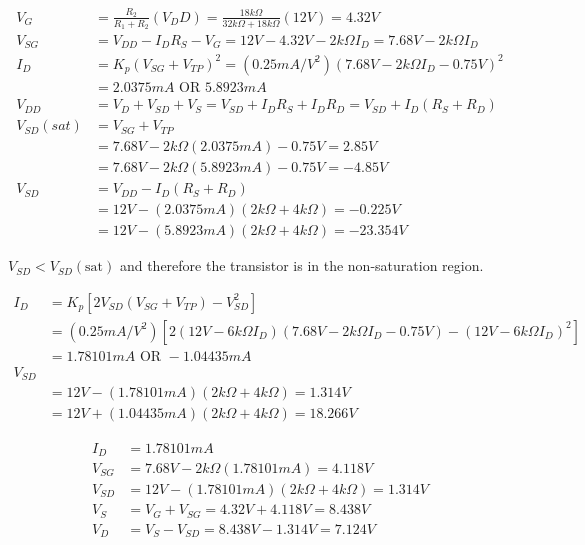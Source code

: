 \documentclass[12pt,letterpaper,titlepage]{article}
\begin{document}
\begin{raggedright}
\begin{align*}
   V_G
    &= \frac{R_2}{R_1 + R_2}(V_DD)
     = \frac{18k\Omega}{32k\Omega+18k\Omega}(12V)
     = 4.32V
\\ V_{SG}
    &= V_{DD} - I_DR_S - V_G
     = 12V - 4.32V - 2k\Omega I_D
     = 7.68V - 2k\Omega I_D
\\ I_D
	&= K_p (V_{SG} + V_{TP})^2
	 = (0.25 mA/V^2) (7.68V - 2k\Omega I_D - 0.75V)^2
\\	&= 2.0375mA\text{ OR } 5.8923mA
\\ V_{DD}
	&= V_D + V_{SD} + V_{S}
	 = V_{SD} + I_DR_S + I_DR_D
	 = V_{SD} + I_D(R_S + R_D)
\\ V_{SD}(sat)
	&= V_{SG} + V_{TP}
\\	&= 7.68V - 2k\Omega (2.0375mA) - 0.75V
	 = 2.85V
\\  &= 7.68V - 2k\Omega (5.8923mA) - 0.75V
     = -4.85V
\\ V_{SD}
	&= V_{DD} - I_D(R_S + R_D)
\\  &= 12V - (2.0375mA)(2k\Omega + 4k\Omega)
	 = -0.225V
\\  &= 12V - (5.8923mA)(2k\Omega + 4k\Omega)
	 = -23.354V
\end{align*}

$V_{SD} < V_{SD}(\text{sat})$ and therefore the transistor is in the non-saturation region.

\begin{align*}
   I_D
  	&= K_p [2V_{SD}(V_{SG} + V_{TP}) - V_{SD}^2]
\\	&= (0.25 mA/V^2)[2(12V - 6k\Omega I_D)(7.68V - 2k\Omega I_D - 0.75V) - (12V - 6k\Omega I_D)^2]
\\	&= 1.78101mA \text{ OR } -1.04435mA
\\ V_{SD}
\\  &= 12V - (1.78101mA)(2k\Omega + 4k\Omega)
	 = 1.314V
\\  &= 12V + (1.04435mA)(2k\Omega + 4k\Omega)
	 = 18.266V
\end{align*}

\begin{align*}
   I_D 
	&= 1.78101mA
\\ V_{SG}
	&= 7.68V - 2k\Omega(1.78101mA)
	 = 4.118V
\\ V_{SD}
    &= 12V - (1.78101mA)(2k\Omega + 4k\Omega)
	 = 1.314V
\\ V_S
	&= V_G + V_{SG}
	 = 4.32V + 4.118V
	 = 8.438V
\\ V_D
	&= V_S - V_{SD}
	 = 8.438V - 1.314V
	 = 7.124V
\end{align*}


\end{raggedright}
\end{document}
